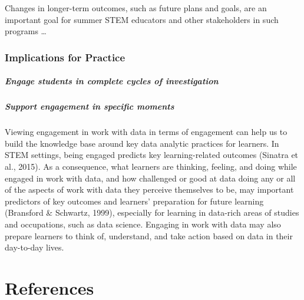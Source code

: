 \documentclass[]{book}
\let\oldparagraph\paragraph
\renewcommand{\paragraph}[1]{\oldparagraph{#1}\mbox{}}
\theoremstyle{definition}
\theoremstyle{definition}
\theoremstyle{definition}
\theoremstyle{remark}
\begin{document}
Changes in longer-term outcomes, such as future plans and goals, are an
important goal for summer STEM educators and other stakeholders in such
programs \ldots{}

\subsection{Implications for Practice}\label{implications-for-practice}

\paragraph{Engage students in complete cycles of
investigation}\label{engage-students-in-complete-cycles-of-investigation}

\paragraph{Support engagement in specific
moments}\label{support-engagement-in-specific-moments}

Viewing engagement in work with data in terms of engagement can help us
to build the knowledge base around key data analytic practices for
learners. In STEM settings, being engaged predicts key learning-related
outcomes (Sinatra et al., 2015). As a consequence, what learners are
thinking, feeling, and doing while engaged in work with data, and how
challenged or good at data doing any or all of the aspects of work with
data they perceive themselves to be, may important predictors of key
outcomes and learners' preparation for future learning (Bransford \&
Schwartz, 1999), especially for learning in data-rich areas of studies
and occupations, such as data science. Engaging in work with data may
also prepare learners to think of, understand, and take action based on
data in their day-to-day lives.

\newpage

\chapter{References}\label{references}

\setlength{\parindent}{-0.5in} \setlength{\leftskip}{0.5in}
\end{document}
